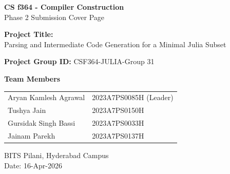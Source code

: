\documentclass[12pt]{article}
\begin{document}
\begin{titlepage}
  \centering

  {\Huge \textbf{CS f364 - Compiler Construction}\\[1.5ex]}
  {\LARGE Phase 2 Submission Cover Page\\[5ex]}

  {\Large \textbf{Project Title:}\\[1ex]}
  {\Large Parsing and Intermediate Code Generation for a Minimal Julia Subset\\[4ex]}

  {\Large \textbf{Project Group ID:} CSF364-JULIA-Group 31\\[4ex]}

  {\Large \textbf{Team Members}\\[1.5ex]}
  \begin{tabular}{ll}
    Aryan Kamlesh Agrawal & 2023A7PS0085H (Leader) \\
    Tushya Jain & 2023A7PS0150H \\
    Gursidak Singh Bassi & 2023A7PS0033H \\
    Jainam Parekh & 2023A7PS0137H \\
  \end{tabular}

  \vfill

  {\large BITS Pilani, Hyderabad Campus\\[1ex]}
  {\large Date: 16-Apr-2026}
\end{titlepage}
\end{document}

